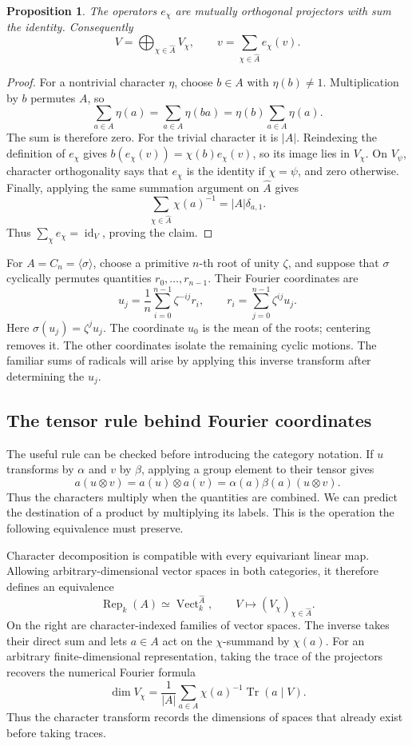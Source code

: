 \documentclass[11pt]{article}
\newtheorem{proposition}{Proposition}[section]
\theoremstyle{remark}
\begin{document}
\begin{proposition}
\label{fourier:projectors}
The operators \(e_\chi\) are mutually orthogonal projectors with sum the identity. Consequently
\[
V=\bigoplus_{\chi\in\widehat A}V_\chi,
\qquad
v=\sum_{\chi\in\widehat A}e_\chi(v).
\]
\end{proposition}

\begin{proof}
For a nontrivial character \(\eta\), choose \(b\in A\) with \(\eta(b)\ne1\). Multiplication by \(b\) permutes \(A\), so
\[
\sum_{a\in A}\eta(a)=\sum_{a\in A}\eta(ba)
=\eta(b)\sum_{a\in A}\eta(a).
\]
The sum is therefore zero. For the trivial character it is \(|A|\). Reindexing the definition of \(e_\chi\) gives
\(b(e_\chi(v))=\chi(b)e_\chi(v)\), so its image lies in \(V_\chi\). On \(V_\psi\), character orthogonality says that \(e_\chi\) is the identity if \(\chi=\psi\), and zero otherwise. Finally, applying the same summation argument on \(\widehat A\) gives
\[
\sum_{\chi\in\widehat A}\chi(a)^{-1}=|A|\delta_{a,1}.
\]
Thus \(\sum_\chi e_\chi=\operatorname{id}_V\), proving the claim.
\end{proof}

For \(A=C_n=\langle\sigma\rangle\), choose a primitive \(n\)-th root of unity \(\zeta\), and suppose that \(\sigma\) cyclically permutes quantities \(r_0,\ldots,r_{n-1}\). Their Fourier coordinates are
\[
u_j=\frac1n\sum_{i=0}^{n-1}\zeta^{-ij}r_i,
\qquad
r_i=\sum_{j=0}^{n-1}\zeta^{ij}u_j.
\]
Here \(\sigma(u_j)=\zeta^ju_j\). The coordinate \(u_0\) is the mean of the roots; centering removes it. The other coordinates isolate the remaining cyclic motions. The familiar sums of radicals will arise by applying this inverse transform after determining the \(u_j\).

\subsection{The tensor rule behind Fourier coordinates}

The useful rule can be checked before introducing the category notation. If \(u\) transforms by \(\alpha\) and \(v\) by \(\beta\), applying a group element to their tensor gives
\[
a(u\otimes v)=a(u)\otimes a(v)=\alpha(a)\beta(a)(u\otimes v).
\]
Thus the characters multiply when the quantities are combined. We can predict the destination of a product by multiplying its labels. This is the operation the following equivalence must preserve.

Character decomposition is compatible with every equivariant linear map. Allowing arbitrary-dimensional vector spaces in both categories, it therefore defines an equivalence
\[
\operatorname{Rep}_k(A)\simeq\operatorname{Vect}_k^{\widehat A},
\qquad
V\longmapsto(V_\chi)_{\chi\in\widehat A}.
\]
On the right are character-indexed families of vector spaces. The inverse takes their direct sum and lets \(a\in A\) act on the \(\chi\)-summand by \(\chi(a)\). For an arbitrary finite-dimensional representation, taking the trace of the projectors recovers the numerical Fourier formula
\[
\dim V_\chi
=\frac1{|A|}\sum_{a\in A}\chi(a)^{-1}\operatorname{Tr}(a\mid V).
\]
Thus the character transform records the dimensions of spaces that already exist before taking traces.
\end{document}
